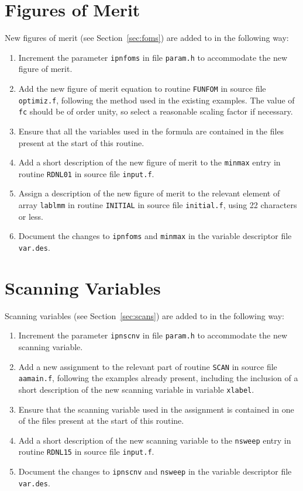 \section{Figures of Merit}

New figures of merit (see Section~\ref{sec:foms}) are added to \PS in
the following way:

\begin{enumerate}
\item
Increment the parameter {\tt ipnfoms} in \INCLUDE file {\tt param.h}
to accommodate the new figure of merit.
\item
Add the new figure of merit equation to routine {\tt FUNFOM} in source
file {\tt optimiz.f}, following the method used in the existing
examples. The value of {\tt fc} should be of order unity, so select a
reasonable scaling factor if necessary.
\item
Ensure that all the variables used in the formula are contained in the
\INCLUDE files present at the start of this routine.
\item
Add a short description of the new figure of merit to the {\tt minmax}
entry in routine {\tt RDNL01} in source file {\tt input.f}.
\item
Assign a description of the new figure of merit to the relevant
element of array {\tt lablmm} in routine {\tt INITIAL} in source file
{\tt initial.f}, using 22 characters or less.
\item
Document the changes to {\tt ipnfoms} and {\tt minmax} in the variable
descriptor file {\tt var.des}.
\end{enumerate}

\section{Scanning Variables}

Scanning variables (see Section~\ref{sec:scans}) are added to \PS in
the following way:

\begin{enumerate}
\item
Increment the parameter {\tt ipnscnv} in \INCLUDE file {\tt param.h}
to accommodate the new scanning variable.
\item
Add a new assignment to the relevant part of routine {\tt SCAN} in
source file {\tt aamain.f}, following the examples already present,
including the inclusion of a short description of the new scanning
variable in variable {\tt xlabel}.
\item
Ensure that the scanning variable used in the assignment is contained
in one of the \INCLUDE files present at the start of this routine.
\item
Add a short description of the new scanning variable to the {\tt nsweep}
entry in routine {\tt RDNL15} in source file {\tt input.f}.
\item
Document the changes to {\tt ipnscnv} and {\tt nsweep} in the variable
descriptor file {\tt var.des}.
\end{enumerate}
